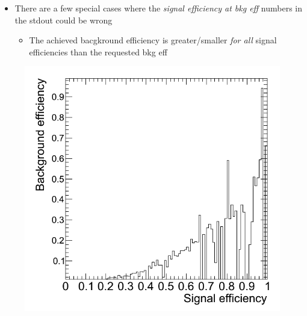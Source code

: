 \begin{itemize}
\item There are a few special cases where the \emph{signal efficiency
    at bkg eff} numbers in the stdout could be wrong
  \begin{itemize}
  \item The achieved bacgkround efficiency is greater/smaller
    \emph{for all} signal efficiencies than the requested bkg eff
  \end{itemize}
\end{itemize}

\begin{figure}[h]
  \begin{center}
    \begin{minipage}{.3\textwidth}
      \includegraphics[width=\textwidth]{images/mk_cuts-tmva-effBvsS}
    \end{minipage}
    \hspace{.02\textwidth}
    \begin{minipage}{.3\textwidth}

\end{minipage}
\end{center}
\end{figure}
